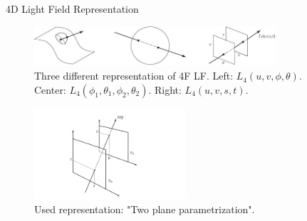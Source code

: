 \begin{frame}{4D Light Field Representation}
\begin{figure}[h!]
\includegraphics[width=0.8\textwidth]{../../Diagrams/Light-field-parametrizations.jpg}
\caption{Three different representation of 4F LF\@. Left: $L_4(u,v,\phi,\theta)$. Center: $L_4(\phi_1,\theta_1,\phi_2,\theta_2)$. Right: $L_4(u,v,s,t)$.}
\end{figure}
\pause
\begin{figure}[h!]
\centering
\includegraphics[width=0.5\textwidth]{../../Diagrams/two-planes_param.jpg}
\caption{Used representation: "Two plane parametrization".}
\label{fig:C2S0F3}
\end{figure}
\end{frame} 

